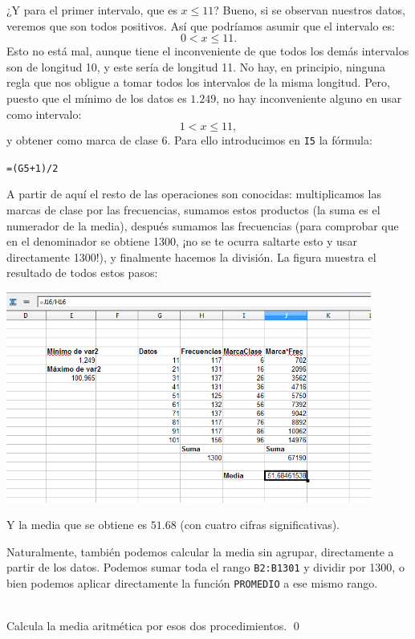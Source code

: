 \documentclass[10pt,a4paper]{article}\usepackage[]{graphicx}\usepackage[]{color}
\begin{document}
¿Y para el primer intervalo, que es $x\leq 11$? Bueno, si se observan nuestros datos, veremos que son todos positivos. Así que podríamos asumir que el intervalo es:
\[0 < x \leq 11.\]
Esto no está mal, aunque tiene el inconveniente de que todos los demás intervalos son de longitud 10, y este sería de longitud 11. No hay, en principio, ninguna regla que nos obligue a tomar todos los intervalos de la misma longitud. Pero, puesto que el mínimo de los datos es $1.249$, no hay inconveniente alguno en usar como intervalo:
\[1 < x \leq 11,\]
y obtener como marca de clase $6$.  Para ello introducimos en {\tt I5} la fórmula:
\begin{center}
{\tt =(G5+1)/2}
\end{center}
A partir de aquí el resto de las operaciones son conocidas: multiplicamos las marcas de clase por las frecuencias, sumamos estos productos (la suma es el numerador de la media), después sumamos las frecuencias (para comprobar que en el denominador se obtiene 1300, ¡no se te ocurra saltarte esto y usar directamente 1300!), y finalmente hacemos la división. La figura muestra el resultado de todos estos pasos:
    \begin{center}
    \includegraphics[width=12cm]{../fig/Tut02-34.png}
    \end{center}
Y la media que se obtiene es $51.68$ (con cuatro cifras significativas).

Naturalmente, también podemos calcular la media sin agrupar, directamente a partir de los datos. Podemos sumar toda el rango {\tt B2:B1301} y dividir por 1300, o bien podemos aplicar directamente la función {\tt PROMEDIO} a ese mismo rango.

\begin{ejercicio}
\quad\\
Calcula la media aritmética por esos dos procedimientos.
\qed\\
\end{ejercicio}
\end{document}
